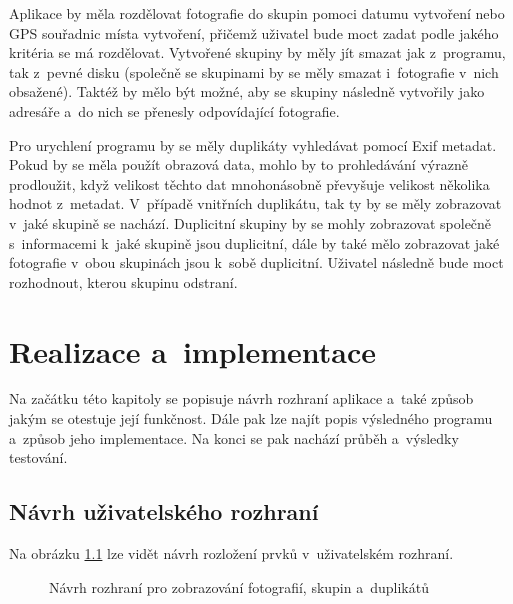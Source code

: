 Aplikace by měla rozdělovat fotografie do skupin pomoci datumu vytvoření nebo GPS souřadnic místa vytvoření, přičemž uživatel bude moct zadat podle jakého kritéria se má rozdělovat. Vytvořené skupiny by měly jít smazat jak z~programu, tak z~pevné disku (společně se skupinami by se měly smazat i~fotografie v~nich obsažené). Taktéž by mělo být možné, aby se skupiny následně vytvořily jako adresáře a~do nich se přenesly odpovídající fotografie.

Pro urychlení programu by se měly duplikáty vyhledávat pomocí Exif metadat. Pokud by se měla použít obrazová data, mohlo by to prohledávání výrazně prodloužit, když velikost těchto dat mnohonásobně převyšuje velikost několika hodnot z~metadat. V~případě vnitřních duplikátu, tak ty by se měly zobrazovat v~jaké skupině se nachází. Duplicitní skupiny by se mohly zobrazovat společně s~informacemi k~jaké skupině jsou duplicitní, dále by také mělo zobrazovat jaké fotografie v~obou skupinách jsou k~sobě duplicitní. Uživatel následně bude moct rozhodnout, kterou skupinu odstraní.


\chapter{Realizace a~implementace}
\label{Real}

Na začátku této kapitoly se popisuje návrh rozhraní aplikace a~také způsob jakým se otestuje její funkčnost. Dále pak lze najít popis výsledného programu a~způsob jeho implementace.  Na konci se pak nachází průběh a~výsledky testování.

\section{Návrh uživatelského rozhraní}
Na obrázku \ref{navrh_hl} lze vidět návrh rozložení prvků v~uživatelském rozhraní.

\begin{figure}[ht]
\begin{center}
\caption{Návrh rozhraní pro zobrazování fotografií, skupin a~duplikátů}
\label{navrh_hl}
\end{center}
\end{figure}

